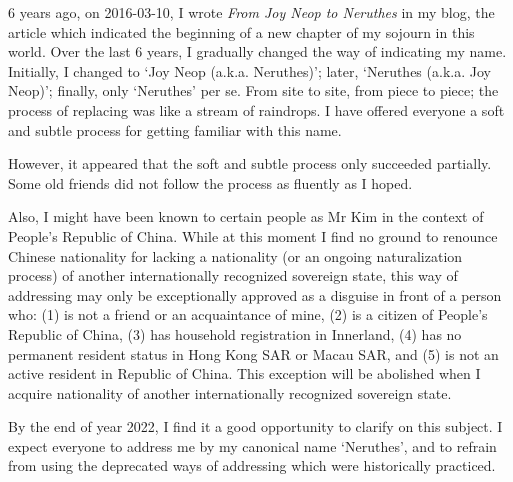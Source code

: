 
\begin{multicols*}{2}
6 years ago, on 2016-03-10, I wrote \textit{From Joy Neop to Neruthes} in my blog,
the article which indicated the beginning of a new chapter of my sojourn in this world.
Over the last 6 years, I gradually changed the way of indicating my name.
Initially, I changed to `Joy Neop (a.k.a. Neruthes)'; later, `Neruthes (a.k.a. Joy Neop)';
finally, only `Neruthes' per se.
From site to site, from piece to piece;
the process of replacing was like a stream of raindrops.
I have offered everyone a soft and subtle process for getting familiar with this name.

However, it appeared that the soft and subtle process only succeeded partially.
Some old friends did not follow the process as fluently as I hoped.

Also, I might have been known to certain people as Mr Kim in the context of People's Republic of China.
While at this moment I find no ground to renounce Chinese nationality for lacking a nationality (or an ongoing naturalization process)
of another internationally recognized sovereign state,
this way of addressing may only be exceptionally approved as a disguise in front of a person who:
(1) is not a friend or an acquaintance of mine,
(2) is a citizen of People's Republic of China,
(3) has household registration in Innerland,
(4) has no permanent resident status in Hong Kong SAR or Macau SAR, and
(5) is not an active resident in Republic of China.
This exception will be abolished when I acquire nationality of another internationally recognized sovereign state.

By the end of year 2022, I find it a good opportunity to clarify on this subject.
I expect everyone to address me by my canonical name `Neruthes',
and to refrain from using the deprecated ways of addressing which were historically practiced.
\end{multicols*}

